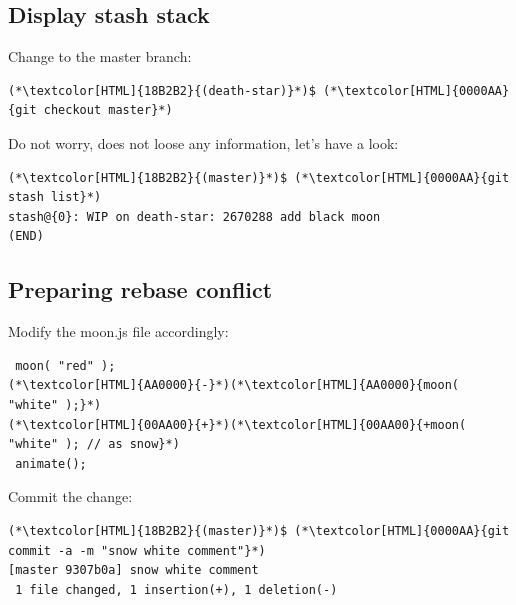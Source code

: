 \subsection{Display stash stack}
\begin{frame}[fragile]
  \subslidetitle

  Change to the master branch:
   \begin{lstlisting}
(*\textcolor[HTML]{18B2B2}{(death-star)}*)$ (*\textcolor[HTML]{0000AA}{git checkout master}*)
\end{lstlisting}

  Do not worry,  does not loose any information, let's have a look:

  \begin{lstlisting}
(*\textcolor[HTML]{18B2B2}{(master)}*)$ (*\textcolor[HTML]{0000AA}{git stash list}*)
stash@{0}: WIP on death-star: 2670288 add black moon
(END)
\end{lstlisting}
\end{frame}


\subsection{Preparing rebase conflict}
\begin{frame}[fragile]
  \subslidetitle

  Modify the moon.js file accordingly:
  \begin{lstlisting}
 moon( "red" );
(*\textcolor[HTML]{AA0000}{-}*)(*\textcolor[HTML]{AA0000}{moon( "white" );}*)
(*\textcolor[HTML]{00AA00}{+}*)(*\textcolor[HTML]{00AA00}{+moon( "white" ); // as snow}*)
 animate();
\end{lstlisting}

  Commit the change:
  \begin{lstlisting}
(*\textcolor[HTML]{18B2B2}{(master)}*)$ (*\textcolor[HTML]{0000AA}{git commit -a -m "snow white comment"}*)
[master 9307b0a] snow white comment
 1 file changed, 1 insertion(+), 1 deletion(-)
\end{lstlisting}
\end{frame}


